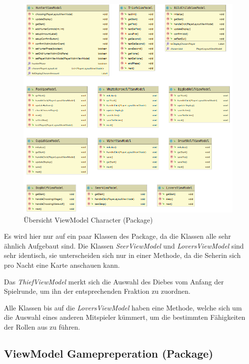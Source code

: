 \begin{figure}[H]
	\centering
	\includegraphics[width=\textwidth]{architektur/View_Char_Uebersicht.png}
	\caption{Übersicht ViewModel Character (Package)}
	\label{figure:viewmodelchar(package)}
\end{figure}

Es wird hier nur auf ein paar Klassen des Package, da die Klassen alle sehr ähnlich Aufgebaut sind.
Die Klassen \textit{SeerViewModel} und \textit{LoversViewModel} sind sehr identisch, sie unterscheiden sich nur in einer Methode, da die Seherin sich pro Nacht eine Karte anschauen kann.

\medskip
Das \textit{ThiefViewModel} merkt sich die Auswahl des Diebes vom Anfang der Spielrunde, um ihn der entsprechenden Fraktion zu zuordnen.

\medskip
Alle Klassen bis auf die \textit{LoversViewModel} haben eine Methode, welche sich um die Auswahl eines anderen Mitspieler kümmert, um die bestimmten Fähigkeiten der Rollen aus zu führen. 

\subsection{ViewModel Gamepreperation (Package)}

